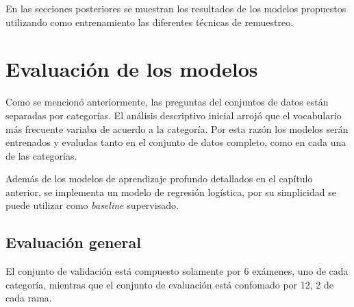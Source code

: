 En las secciones posteriores se muestran los resultados de los modelos propuestos utilizando como entrenamiento las diferentes técnicas de remuestreo.

\section{Evaluación de los modelos}

Como se mencionó anteriormente, las preguntas del conjuntos de datos están separadas por categorías. El análisis descriptivo inicial arrojó que el vocabulario más frecuente variaba de acuerdo a la categoría. Por esta razón los modelos serán entrenados y evaludas tanto en el conjunto de datos completo, como en cada una de las categorías.

Además de los modelos de aprendizaje profundo detallados en el capítulo anterior, se implementa un modelo de regresión logística, por su simplicidad se puede utilizar como \textit{baseline} supervisado. 



\subsection{Evaluación general}

El conjunto de validación está compuesto solamente por 6 exámenes, uno de cada categoría, mientras que el conjunto de evaluación está confomado por 12, 2 de cada rama.


